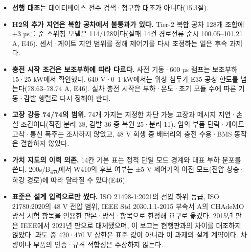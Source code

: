 \begin{itemize}
\item \textbf{선행 대조}는 데이터베이스 전수 검색·청구항 대조가 아니다(15.3절).
\item \textbf{H2의 추가 지연은 복합 공차에서 불통과가 있다.} Tier-2 복합 공차 128개 조합에 +3 µs를 준 스위칭 모델은 114/128이다(실패 14건 경로전류 순시 100.05–101.21 A, E46). 센서·게이트 지연 범위를 정해 제어기를 다시 조정하는 일은 후속 과제다.
\item \textbf{충전 시작 조건은 보조부하에 따라 다르다.} 사전 기동·600 µs 램프는 보조부하 15·25 kW에서 확인했다. 640 V·0–1 kW에서는 위상 첨두가 E35 공칭 한도를 넘는다(78.63–78.74 A, E46). 실차 충전 시작은 부하·온도·초기 모듈 수에 따른 기동·감발 행렬로 다시 정해야 한다.
\item \textbf{고장 강등 74/74의 범위.} 74개 가지는 지정한 차단 가능 고장과 메시지 지연·손실 조건이다(직접 분리 38, 감발 36 중 복원 25·분리 11). 임의 부품 단락·게이트 고착·통신 폭주는 조사하지 않았고, 48 V 회생 중 배터리의 충전 수용·BMS 동작은 결합하지 않았다.
\item \textbf{가치 지도의 이력 의존.} 14칸 기본 표는 정적 단일 모드 경계와 대표 부하 분포를 쓴다. 200s/B\textsubscript{470}에서 W410의 후보 여부는 ±5 V 제어기의 이전 모드(전압 상승·하강 경로)에 따라 달라질 수 있다(E46).
\item \textbf{표준은 설계 입력으로만 썼다.} ISO 21498-1:2021의 전압 하위 등급, ISO 21780:2020의 48 V 전압 범위, IEEE Std 2030.1.1-2015 부속서 A의 CHAdeMO 방식 시험 항목을 인용한 판본·방식·항목으로 한정해 요구로 옮겼다. 2015년 판은 IEEE에서 2021년 판으로 대체됐으며, 이 보고는 현행판과의 차이를 대조하지 않았다. 과도 중 420·470 V 상한은 표준 값이 아니라 이 과제의 설계 계약이다. 차량이나 부품의 인증·규격 적합성은 주장하지 않는다.
\end{itemize}
